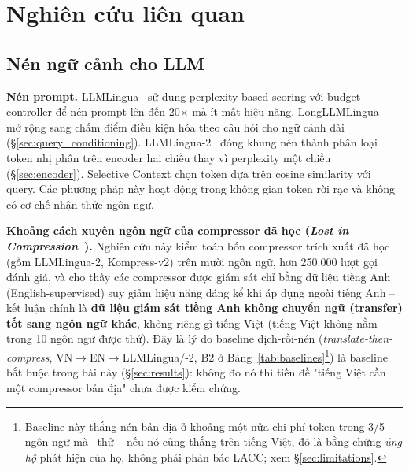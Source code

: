 \documentclass[12pt,a4paper]{article}
\newcommand{\method}[1]{\textsc{#1}}         %
\begin{document}
\section{Nghiên cứu liên quan}

\subsection{Nén ngữ cảnh cho LLM}

\textbf{Nén prompt.} LLMLingua~\cite{jiang2023llmlingua} sử dụng perplexity-based scoring với budget controller để nén prompt lên đến 20$\times$ mà ít mất hiệu năng. LongLLMLingua~\cite{jiang2023longllmlingua} mở rộng sang chấm điểm điều kiện hóa theo câu hỏi cho ngữ cảnh dài (\S\ref{sec:query_conditioning}). LLMLingua-2~\cite{pan2024llmlingua2} đóng khung nén thành phân loại token nhị phân trên encoder hai chiều thay vì perplexity một chiều (\S\ref{sec:encoder}). Selective Context chọn token dựa trên cosine similarity với query. Các phương pháp này hoạt động trong không gian token rời rạc và không có cơ chế nhận thức ngôn ngữ.

\textbf{Khoảng cách xuyên ngôn ngữ của compressor đã học (\textit{Lost in Compression}~\cite{lukauskas2026lost}).} Nghiên cứu này kiểm toán bốn compressor trích xuất đã học (gồm LLMLingua-2, Kompress-v2) trên mười ngôn ngữ, hơn 250.000 lượt gọi đánh giá, và cho thấy các compressor được giám sát chỉ bằng dữ liệu tiếng Anh (English-supervised) suy giảm hiệu năng đáng kể khi áp dụng ngoài tiếng Anh -- kết luận chính là \textbf{dữ liệu giám sát tiếng Anh không chuyển ngữ (transfer) tốt sang ngôn ngữ khác}, không riêng gì tiếng Việt (tiếng Việt không nằm trong 10 ngôn ngữ được thử). Đây là lý do baseline dịch-rồi-nén (\textit{translate-then-compress}, VN$\to$EN$\to$LLMLingua/-2, B2 ở Bảng~\ref{tab:baselines}\footnote{Baseline này thắng nén bản địa ở khoảng một nửa chi phí token trong 3/5 ngôn ngữ mà~\cite{lukauskas2026lost} thử -- nếu nó cũng thắng trên tiếng Việt, đó là bằng chứng \textit{ủng hộ} phát hiện của họ, không phải phản bác \method{LACC}; xem \S\ref{sec:limitations}.}) là baseline bắt buộc trong bài này (\S\ref{sec:results}): không đo nó thì tiền đề "tiếng Việt cần một compressor bản địa" chưa được kiểm chứng.
\end{document}
